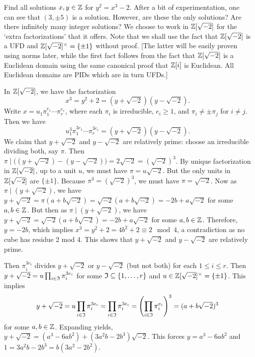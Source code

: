 \begin{ex}\label{ex:z(-sqrt(2))}
Find all solutions $x,y \in \mathbb{Z}$ for $y^2=x^3-2$. After a bit of experimentation, one can see that $(3,\pm 5)$ is a solution. However, are these the only solutions? Are there infinitely many integer solutions? We choose to work in $\mathbb{Z}[\sqrt{-2}]$ for the `extra factorizations' that it offers. Note that we shall use the fact that $\mathbb{Z}[\sqrt{-2}]$ is a UFD and $\mathbb{Z}[\sqrt{-2}]^\times=\{\pm 1\}$ without proof. [The latter will be easily proven using norms later, while the first fact follows from the fact that $\mathbb{Z}[\sqrt{-2}]$ is a Euclidean domain using the same canonical proof that $\mathbb{Z}[i]$ is Euclidean. All Euclidean domains are PIDs which are in turn UFDs.]

In $\mathbb{Z}[\sqrt{-2}]$, we have the factorization 
	\[
	x^3=y^2+2=(y+\sqrt{-2})(y-\sqrt{-2}). 
	\]
Write $x=u_1 \pi_1^{e_1}\cdots \pi_r^{e_r}$, where each $\pi_i$ is irreducible, $e_i \geq 1$, and $\pi_i \neq \pm \pi_j$ for $i \neq j$. Then we have
	\[
	u_1^3 \pi_1^{3e_1}\cdots \pi_r^{3e_r}=(y+\sqrt{-2})(y-\sqrt{-2}). 
	\]
We claim that $y+\sqrt{-2}$ and $y-\sqrt{-2}$ are relatively prime: choose an irreducible dividing both, say $\pi$. Then $\pi \mid \big(( y + \sqrt{-2}) - (y - \sqrt{-2}) \big)= 2\sqrt{-2}= (\sqrt{-2})^3$. By unique factorization in $\mathbb{Z}[\sqrt{-2}]$, up to a unit $u$, we must have $\pi= u\sqrt{-2}$. But the only units in $\mathbb{Z}[\sqrt{-2}]$ are $\{\pm 1\}$. Because $\pi^3= (\sqrt{-2})^3$, we must have $\pi= \sqrt{-2}$. Now as $\pi \mid (y + \sqrt{-2})$, we have $y + \sqrt{-2} = \pi (a + b \sqrt{-2})= \sqrt{-2} (a + b\sqrt{-2})= -2b + a\sqrt{-2}$ for some $a, b \in \mathbb{Z}$. But then as $\pi \mid (y + \sqrt{-2})$, we have $y + \sqrt{-2}= \sqrt{-2}(a + b\sqrt{-2})= -2b + a\sqrt{-2}$ for some $a, b \in \mathbb{Z}$. Therefore, $y= -2b$, which implies $x^3= y^2 + 2= 4b^2+2 \equiv 2 \mod 4$, a contradiction as no cube has residue 2 mod 4. This shows that $y + \sqrt{-2}$ and $y - \sqrt{-2}$ are relatively prime.

Then $\pi_i^{3e_i}$ divides $y+\sqrt{-2}$ or $y-\sqrt{-2}$ (but not both) for each $1 \leq i \leq r$. Then $y+\sqrt{-2}= u \prod_{i \in \mathfrak{I}} \pi_i^{3e_i}$ for some $\mathfrak{I} \subseteq \{ 1, \ldots, r \}$ and $u \in \mathbb{Z}[\sqrt{-2}]^\times= \{ \pm 1 \}$. This implies 
	\[
	y + \sqrt{-2}= u \prod_{i \in \mathfrak{I}} \pi_i^{3e_i}= \prod_{i \in \mathfrak{I}} \pi_i^{3e_i}= \left( \prod_{i \in \mathfrak{I}} \pi_i^{e_i} \right)^3= (a + b\sqrt{-2} )^3
	\]
 for some $a,b \in \mathbb{Z}$. Expanding yields, $y+\sqrt{-2}=(a^3-6ab^2)+(3a^2b-2b^3)\sqrt{-2}$. This forces $y= a^3 - 6ab^2$ and $1= 3a^2b - 2b^3= b(3a^2 - 2b^2)$.


\end{ex}
